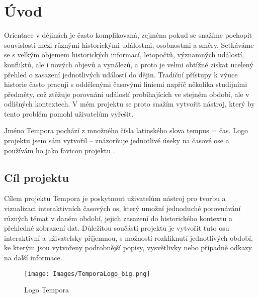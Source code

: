 \section{Úvod}

Orientace v dějinách je často komplikovaná, zejména pokud se snažíme pochopit souvislosti mezi různými historickými událostmi, osobnostmi a směry. Setkáváme se s velkým objemem historických informací, letopočtů, významných událostí, konfliktů, ale i nových objevů a vynálezů, a proto je velmi obtížné získat ucelený přehled o zasazení jednotlivých událostí do dějin.
Tradiční přístupy k výuce historie často pracují s oddělenými časovými liniemi napříč několika studijními předměty, což ztěžuje porovnání událostí probíhajících ve stejném období, ale v odlišných kontextech. V mém projektu se proto snažím vytvořit nástroj, který by tento problém pomohl uživatelům vyřešit.

Jméno Tempora pochází z množného čísla latinského slova tempus = čas. Logo projektu jsem sám vytvořil – znázorňuje jednotlivé úseky na časové ose a používám ho jako favicon projektu \cite{Favicon}.

\subsection{Cíl projektu}

Cílem projektu Tempora je poskytnout uživatelům nástroj pro tvorbu a vizualizaci interaktivních časových os, který umožní jednoduché porovnávání různých témat v daném období, jejich zasazení do historického kontextu a přehledné zobrazení dat. Důležitou součástí projektu je vytvořit tuto osu interaktivní a uživatelsky příjemnou, s možností rozkliknutí jednotlivých období, ke kterým jsou vytvořeny podrobnější popisy, vysvětlivky nebo případně odkazy na další informace.



\vspace{2cm}

\begin{figure}[h]
    \centering
    \texttt{[image: Images/TemporaLogo\_big.png]}
    \caption{Logo Tempora}
    \label{fig:logo}
\end{figure}